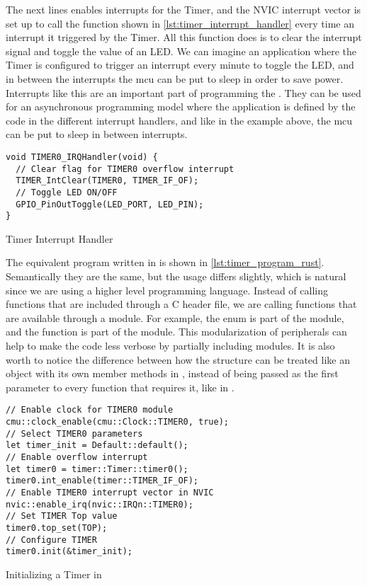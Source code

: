 The next lines enables interrupts for the Timer, and the NVIC interrupt vector is set up to call the function shown in \autoref{lst:timer_interrupt_handler} every time an interrupt it triggered by the Timer.
All this function does is to clear the interrupt signal and toggle the value of an LED.
We can imagine an application where the Timer is configured to trigger an interrupt every minute to toggle the LED, and in between the interrupts the \gls{mcu} can be put to sleep in order to save power.
Interrupts like this are an important part of programming the {\gecko}.
They can be used for an asynchronous programming model where the application is defined by the code in the different interrupt handlers, and like in the example above, the \gls{mcu} can be put to sleep in between interrupts.

\begin{listing}[h]
\begin{verbatim}
void TIMER0_IRQHandler(void) {
  // Clear flag for TIMER0 overflow interrupt
  TIMER_IntClear(TIMER0, TIMER_IF_OF);
  // Toggle LED ON/OFF
  GPIO_PinOutToggle(LED_PORT, LED_PIN);
}
\end{verbatim}
\caption{Timer Interrupt Handler}
\label{lst:timer_interrupt_handler}
\end{listing}

The equivalent program written in {\rust} is shown in \autoref{lst:timer_program_rust}.
Semantically they are the same, but the usage differs slightly, which is natural since we are using a higher level programming language.
Instead of calling functions that are included through a C header file, we are calling functions that are available through a {\rust} module.
For example, the  enum is part of the  module, and the  function is part of the  module.
This modularization of peripherals can help to make the code less verbose by partially including modules.
It is also worth to notice the difference between how the  structure can be treated like an object with its own member methods in {\rust}, instead of being passed as the first parameter to every function that requires it, like in {\C}.

\begin{listing}[h]
\begin{verbatim}
// Enable clock for TIMER0 module
cmu::clock_enable(cmu::Clock::TIMER0, true);
// Select TIMER0 parameters
let timer_init = Default::default();
// Enable overflow interrupt
let timer0 = timer::Timer::timer0();
timer0.int_enable(timer::TIMER_IF_OF);
// Enable TIMER0 interrupt vector in NVIC
nvic::enable_irq(nvic::IRQn::TIMER0);
// Set TIMER Top value
timer0.top_set(TOP);
// Configure TIMER
timer0.init(&timer_init);
\end{verbatim}
\caption{Initializing a Timer in {\rust}}
\label{lst:timer_program_rust}
\end{listing}

